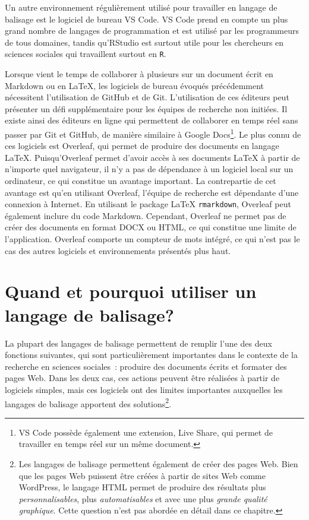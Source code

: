 \documentclass[
  letterpaper,
  DIV=11,
  numbers=noendperiod]{scrreprt}
\begin{document}
Un autre environnement régulièrement utilisé pour travailler en langage
de balisage est le logiciel de bureau VS Code. VS Code prend en compte
un plus grand nombre de langages de programmation et est utilisé par les
programmeurs de tous domaines, tandis qu'RStudio est surtout utile pour
les chercheurs en sciences sociales qui travaillent surtout en
\texttt{R}.

Lorsque vient le temps de collaborer à plusieurs sur un document écrit
en Markdown ou en LaTeX, les logiciels de bureau évoqués précédemment
nécessitent l'utilisation de GitHub et de Git. L'utilisation de ces
éditeurs peut présenter un défi supplémentaire pour les équipes de
recherche non initiées. Il existe ainsi des éditeurs en ligne qui
permettent de collaborer en temps réel sans passer par Git et GitHub, de
manière similaire à Google Docs\footnote{VS Code possède également une
  extension, Live Share, qui permet de travailler en temps réel sur un
  même document.}. Le plus connu de ces logiciels est Overleaf, qui
permet de produire des documents en langage LaTeX. Puisqu'Overleaf
permet d'avoir accès à ses documents LaTeX à partir de n'importe quel
navigateur, il n'y a pas de dépendance à un logiciel local sur un
ordinateur, ce qui constitue un avantage important. La contrepartie de
cet avantage est qu'en utilisant Overleaf, l'équipe de recherche est
dépendante d'une connexion à Internet. En utilisant le package LaTeX
\texttt{rmarkdown}, Overleaf peut également inclure du code Markdown.
Cependant, Overleaf ne permet pas de créer des documents en format DOCX
ou HTML, ce qui constitue une limite de l'application. Overleaf comporte
un compteur de mots intégré, ce qui n'est pas le cas des autres
logiciels et environnements présentés plus haut.

\section{Quand et pourquoi utiliser un langage de
balisage?}\label{quand-et-pourquoi-utiliser-un-langage-de-balisage}

La plupart des langages de balisage permettent de remplir l'une des deux
fonctions suivantes, qui sont particulièrement importantes dans le
contexte de la recherche en sciences sociales~: produire des documents
écrits et formater des pages Web. Dans les deux cas, ces actions peuvent
être réalisées à partir de logiciels simples, mais ces logiciels ont des
limites importantes auxquelles les langages de balisage apportent des
solutions\footnote{Les langages de balisage permettent également de
  créer des pages Web. Bien que les pages Web puissent être créées à
  partir de sites Web comme WordPress, le langage HTML permet de
  produire des résultats plus \emph{personnalisables}, plus
  \emph{automatisables} et avec une plus \emph{grande qualité
  graphique}. Cette question n'est pas abordée en détail dans ce
  chapitre.}.
\end{document}

